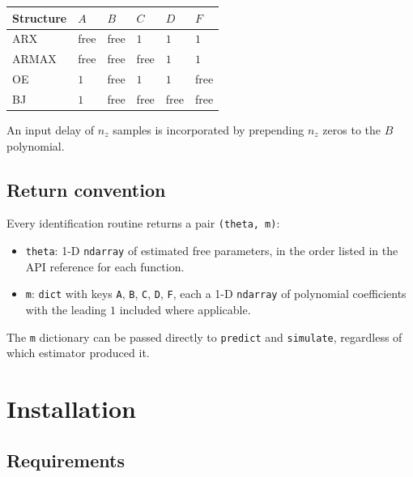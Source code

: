 \documentclass[11pt,a4paper]{article}
\begin{document}
\begin{center}
\begin{tabular}{llllll}
  \toprule
  Structure & $A$ & $B$ & $C$ & $D$ & $F$ \\
  \midrule
  ARX    & free & free & $1$  & $1$  & $1$  \\
  ARMAX  & free & free & free & $1$  & $1$  \\
  OE     & $1$  & free & $1$  & $1$  & free \\
  BJ     & $1$  & free & free & free & free \\
  \bottomrule
\end{tabular}
\end{center}

An input delay of $n_z$ samples is incorporated by prepending $n_z$
zeros to the $B$ polynomial.

\subsection{Return convention}

Every identification routine returns a pair \texttt{(theta, m)}:

\begin{itemize}
  \item \texttt{theta}: 1-D \texttt{ndarray} of estimated free parameters,
        in the order listed in the API reference for each function.
  \item \texttt{m}: \texttt{dict} with keys \texttt{A}, \texttt{B},
        \texttt{C}, \texttt{D}, \texttt{F}, each a 1-D \texttt{ndarray}
        of polynomial coefficients with the leading $1$ included where
        applicable.
\end{itemize}

The \texttt{m} dictionary can be passed directly to \texttt{predict}
and \texttt{simulate}, regardless of which estimator produced it.

\newpage
\section{Installation}

\subsection{Requirements}
\end{document}

